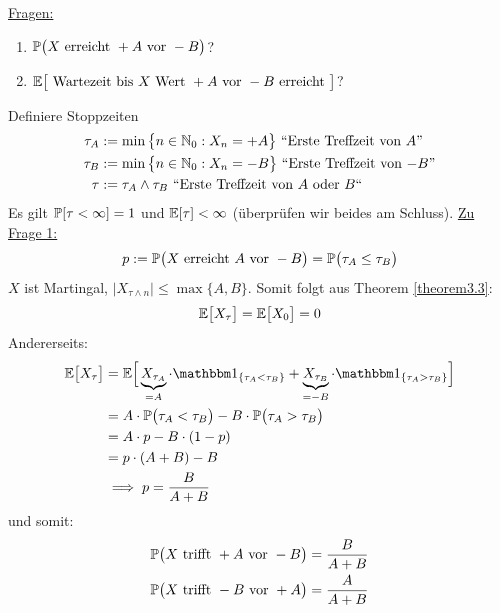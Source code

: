 \begin{beisp}
	\underline{Fragen:} 
	\begin{enumerate}
		\item $\P\big( X\text{ erreicht }+A\text{ vor }-B\big)$?
		\item $\E\big[\text{ Wartezeit bis }X\text{ Wert }+A\text{ vor }-B\text{ erreicht }\big]$?
	\end{enumerate}
	Definiere Stoppzeiten 
	\begin{align*}
		\tau_A&:=\min\big\lbrace n\in\N_0:X_n=+A\big\rbrace\text{ ``Erste Treffzeit von $A$''}\\
		\tau_B&:=\min\big\lbrace n\in\N_0:X_n=-B\big\rbrace\text{ ``Erste Treffzeit von $-B$''}\\
		\tau&:=\tau_A\wedge\tau_B\text{ ``Erste Treffzeit von $A$ oder $B$``}
	\end{align*}
	Es gilt $\P[\tau<\infty]=1$  und $\E[\tau]<\infty$ (überprüfen wir beides am Schluss).\nl
	\underline{Zu Frage 1:}
	\begin{align*}
		p:=\P\big( X\text{ erreicht }A\text{ vor }-B\big)=\P\big(\tau_A\leq\tau_B\big)
	\end{align*}
	$X$ ist Martingal, $\big|X_{\tau\wedge n}\big|\leq\max\lbrace A,B\rbrace$. Somit folgt aus Theorem \ref{theorem3.3}:
	\begin{align*}
		\E\big[X_\tau\big]=\E\big[X_0\big]=0
	\end{align*}
	Andererseits: 
	\begin{align*}
		\E\big[X_\tau\big]&=\E\Big[\underbrace{X_{\tau_A}}_{=A}\cdot\indi_{\lbrace\tau_A<\tau_B\rbrace}+\underbrace{X_{\tau_B}}_{=-B}\cdot\indi_{\lbrace\tau_A>\tau_B\rbrace}\Big]\\
		&=A\cdot\P\big(\tau_A<\tau_B\big)-B\cdot\P\big(\tau_A>\tau_B\big)\\
		&=A\cdot p-B\cdot(1-p)\\
		&=p\cdot(A+B)-B\\
		&\implies
		p=\frac{B}{A+B}
	\end{align*}
	und somit:
	\begin{align*}
		\P\big(X\text{ trifft }+A\text{ vor }-B\big)&=\frac{B}{A+B}\\
		\P\big(X\text{ trifft }-B\text{ vor }+A\big)&=\frac{A}{A+B}\\
	\end{align*}


\end{beisp}
